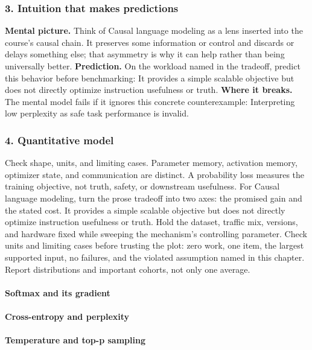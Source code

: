 \subsubsection*{3. Intuition that makes predictions}
\textbf{Mental picture.} Think of Causal language modeling as a lens inserted into the course's causal chain. It preserves some information or control and discards or delays something else; that asymmetry is why it can help rather than being universally better.
\textbf{Prediction.} On the workload named in the tradeoff, predict this behavior before benchmarking: It provides a simple scalable objective but does not directly optimize instruction usefulness or truth.
\textbf{Where it breaks.} The mental model fails if it ignores this concrete counterexample: Interpreting low perplexity as safe task performance is invalid.
\subsubsection*{4. Quantitative model}
Check shape, units, and limiting cases. Parameter memory, activation memory, optimizer state, and communication are distinct. A probability loss measures the training objective, not truth, safety, or downstream usefulness.
For Causal language modeling, turn the prose tradeoff into two axes: the promised gain and the stated cost. It provides a simple scalable objective but does not directly optimize instruction usefulness or truth. Hold the dataset, traffic mix, versions, and hardware fixed while sweeping the mechanism's controlling parameter.
Check units and limiting cases before trusting the plot: zero work, one item, the largest supported input, no failures, and the violated assumption named in this chapter. Report distributions and important cohorts, not only one average.
\paragraph{Softmax and its gradient}
\paragraph{Cross-entropy and perplexity}
\paragraph{Temperature and top-p sampling}
